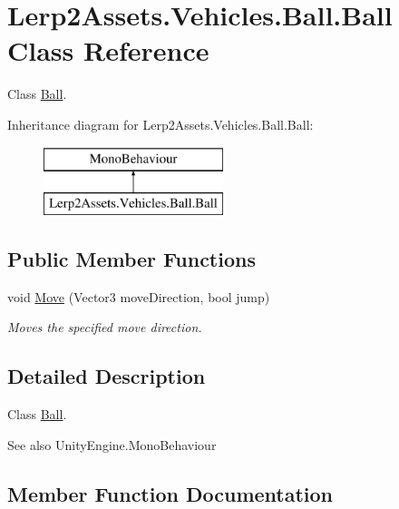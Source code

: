 \hypertarget{class_lerp2_assets_1_1_vehicles_1_1_ball_1_1_ball}{}\section{Lerp2\+Assets.\+Vehicles.\+Ball.\+Ball Class Reference}
\label{class_lerp2_assets_1_1_vehicles_1_1_ball_1_1_ball}


Class \hyperlink{class_lerp2_assets_1_1_vehicles_1_1_ball_1_1_ball}{Ball}.  


Inheritance diagram for Lerp2\+Assets.\+Vehicles.\+Ball.\+Ball\+:\begin{figure}[H]
\begin{center}
\leavevmode
\includegraphics[height=2.000000cm]{class_lerp2_assets_1_1_vehicles_1_1_ball_1_1_ball}
\end{center}
\end{figure}
\subsection*{Public Member Functions}
\begin{DoxyCompactItemize}
\item 
void \hyperlink{class_lerp2_assets_1_1_vehicles_1_1_ball_1_1_ball_aeb3d46664b8918661e0017f474e23596}{Move} (Vector3 move\+Direction, bool jump)
\begin{DoxyCompactList}\small\item\em Moves the specified move direction. \end{DoxyCompactList}\end{DoxyCompactItemize}


\subsection{Detailed Description}
Class \hyperlink{class_lerp2_assets_1_1_vehicles_1_1_ball_1_1_ball}{Ball}. 

\begin{DoxySeeAlso}{See also}
Unity\+Engine.\+Mono\+Behaviour


\end{DoxySeeAlso}


\subsection{Member Function Documentation}
\mbox{\label{class_lerp2_assets_1_1_vehicles_1_1_ball_1_1_ball_aeb3d46664b8918661e0017f474e23596}} 
